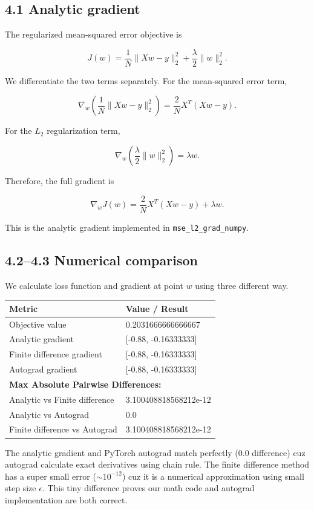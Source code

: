 \documentclass[11pt]{article}
\begin{document}
\subsection*{4.1 Analytic gradient}
The regularized mean-squared error objective is

\[
J(w)
=
\frac{1}{N}\|Xw-y\|_2^2
+
\frac{\lambda}{2}\|w\|_2^2.
\]

We differentiate the two terms separately. For the mean-squared error term,

\[
\nabla_w
\left(
\frac{1}{N}\|Xw-y\|_2^2
\right)
=
\frac{2}{N}X^T(Xw-y).
\]

For the $L_2$ regularization term,

\[
\nabla_w
\left(
\frac{\lambda}{2}\|w\|_2^2
\right)
=
\lambda w.
\]

Therefore, the full gradient is

\[
\boxed{
\nabla_w J(w)
=
\frac{2}{N}X^T(Xw-y)
+
\lambda w
}.
\]

This is the analytic gradient implemented in
\texttt{mse\_l2\_grad\_numpy}.

\subsection*{4.2--4.3 Numerical comparison}
We calculate loss function and gradient at point $w$ using three different way. 
\begin{table}[h]
   \centering
   \begin{tabular}{ll}
    \toprule
    Metric & Value / Result \\
    \midrule
    Objective value & 0.2031666666666667 \\
    Analytic gradient & [-0.88, -0.16333333] \\
    Finite difference gradient & [-0.88, -0.16333333] \\
    Autograd gradient & [-0.88, -0.16333333] \\
    \midrule
    \multicolumn{2}{l}{\textbf{Max Absolute Pairwise Differences:}} \\
    Analytic vs Finite difference & 3.100408818568212e-12 \\
    Analytic vs Autograd & 0.0 \\
    Finite difference vs Autograd & 3.100408818568212e-12 \\
    \bottomrule
   \end{tabular}
\end{table}
The analytic gradient and PyTorch autograd match perfectly (0.0 difference) cuz autograd calculate exact derivatives using chain rule. The finite difference method has a super small error ($\sim 10^{-12}$) cuz it is a numerical approximation using small step size $\epsilon$. This tiny difference proves our math code and autograd implementation are both correct.
\end{document}
